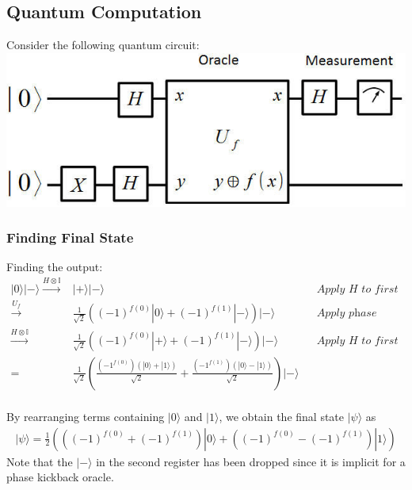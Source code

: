 \documentclass{article}
\begin{document}
    \subsection{Quantum Computation}
    Consider the following quantum circuit:\\
    \includegraphics{images/The-Deutsch-Algorithm.jpg}

    \subsubsection{Finding Final State}
    Finding the output: \\
    \begin{align*}
        |0\rangle|-\rangle \xrightarrow{H \otimes \mathbb{I}} &|+\rangle|-\rangle  && \textit{Apply H to first register} \\
        \xrightarrow{U_f} &\frac{1}{\sqrt{2}} ((-1)^{f(0)}|0\rangle + (-1)^{f(1)}|-\rangle) |-\rangle && \textit{Apply phase kickback}\\
        \xrightarrow{H \otimes \mathbb{I}} &\frac{1}{\sqrt{2}} ((-1)^{f(0)}|+\rangle + (-1)^{f(1)}|-\rangle) |-\rangle && \textit{Apply H to first register}\\
        =&\frac{1}{\sqrt{2}} \left( \frac{(-1^{f(0)})(|0\rangle + |1\rangle)}{\sqrt{2}} + \frac{(-1^{f(1)})(|0\rangle - |1\rangle)}{\sqrt{2}}\right)|-\rangle \\
    \end{align*}

    By rearranging terms containing $|0\rangle$ and $|1\rangle$, we obtain the final state $|\psi\rangle$ as
    \begin{align*}
        |\psi\rangle=\frac{1}{2} \left( ((-1)^{f(0)} + (-1)^{f(1)})|0\rangle + ((-1)^{f(0)} - (-1)^{f(1)})|1\rangle \right)
    \end{align*}
    Note that the $|-\rangle$ in the second register has been dropped since it is implicit for a phase kickback oracle.
\end{document}
